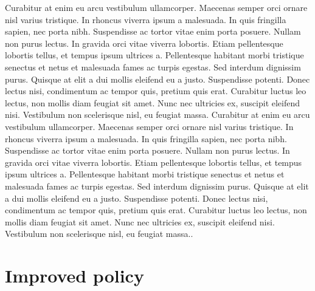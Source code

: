 \documentclass[11pt]{report}
\begin{document}
Curabitur at enim eu arcu vestibulum ullamcorper. Maecenas semper orci ornare nisl varius tristique. In rhoncus viverra ipsum a malesuada. In quis fringilla sapien, nec porta nibh. Suspendisse ac tortor vitae enim porta posuere. Nullam non purus lectus. In gravida orci vitae viverra lobortis. Etiam pellentesque lobortis tellus, et tempus ipsum ultrices a. Pellentesque habitant morbi tristique senectus et netus et malesuada fames ac turpis egestas. Sed interdum dignissim purus. Quisque at elit a dui mollis eleifend eu a justo. Suspendisse potenti. Donec lectus nisi, condimentum ac tempor quis, pretium quis erat. Curabitur luctus leo lectus, non mollis diam feugiat sit amet. Nunc nec ultricies ex, suscipit eleifend nisi. Vestibulum non scelerisque nisl, eu feugiat massa. Curabitur at enim eu arcu vestibulum ullamcorper. Maecenas semper orci ornare nisl varius tristique. In rhoncus viverra ipsum a malesuada. In quis fringilla sapien, nec porta nibh. Suspendisse ac tortor vitae enim porta posuere. Nullam non purus lectus. In gravida orci vitae viverra lobortis. Etiam pellentesque lobortis tellus, et tempus ipsum ultrices a. Pellentesque habitant morbi tristique senectus et netus et malesuada fames ac turpis egestas. Sed interdum dignissim purus. Quisque at elit a dui mollis eleifend eu a justo. Suspendisse potenti. Donec lectus nisi, condimentum ac tempor quis, pretium quis erat. Curabitur luctus leo lectus, non mollis diam feugiat sit amet. Nunc nec ultricies ex, suscipit eleifend nisi. Vestibulum non scelerisque nisl, eu feugiat massa.\cite{kayser2013anti}. 

\section*{Improved policy}
\end{document}
